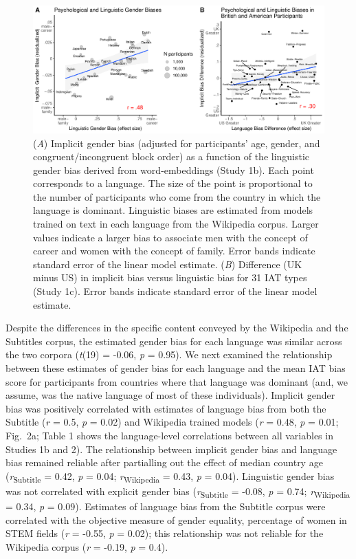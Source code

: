 \documentclass[9pt,twocolumn,twoside]{pnas-new}
\begin{document}
\begin{figure}[t!]
\centering
\includegraphics[width=17cm]{pnas_rmd/iat_lang_pnas_files/figure-latex/study1_fig.pdf}
\caption{\label{fig:unnamed-chunk-11} ({\it A})  Implicit gender bias (adjusted for participants' age, gender, and congruent/incongruent block order) as a function of the linguistic gender bias derived from word-embeddings (Study 1b). Each point corresponds to a language. The size of the point is proportional to the number of participants who come from the country in which the language is dominant. Linguistic biases are estimated from models trained on text in each language from the Wikipedia corpus. Larger values indicate a larger bias to associate men with the concept of career and women with the concept of family. Error bands indicate standard error of the linear model estimate. ({\it B}) Difference (UK minus US) in implicit bias versus linguistic bias for 31 IAT types (Study 1c). Error bands indicate standard error of the linear model
estimate.}
\end{figure}



Despite the differences in the specific content conveyed by the
Wikipedia and the Subtitles corpus, the estimated gender bias for each
language was similar across the two corpora (\emph{t}(19) = -0.06,
\emph{p} = 0.95). We next examined the relationship between these
estimates of gender bias for each language and the mean IAT bias score
for participants from countries where that language was dominant (and,
we assume, was the native language of most of these individuals).
Implicit gender bias was positively correlated with estimates of
language bias from both the Subtitle (\emph{r} = 0.5, \emph{p} = 0.02)
and Wikipedia trained models (\emph{r} = 0.48, \emph{p} = 0.01; Fig.\ 2a;
Table 1 shows the language-level correlations between all variables in
Studies 1b and 2). The relationship between implicit gender bias and
language bias remained reliable after partialling out the effect of
median country age (\emph{r}\textsubscript{Subtitle}  = 0.42, \emph{p} = 0.04;
\emph{r}\textsubscript{Wikipedia}  = 0.43, \emph{p} = 0.04). Linguistic gender bias was
not correlated with explicit gender bias (\emph{r}\textsubscript{Subtitle} = -0.08,
\emph{p} = 0.74; \emph{r}\textsubscript{Wikipedia} = 0.34, \emph{p} = 0.09). Estimates
of language bias from the Subtitle corpus were correlated with the
objective measure of gender equality, percentage of women in STEM fields
(\emph{r} = -0.55, \emph{p} = 0.02); this relationship was not reliable
for the Wikipedia corpus (\emph{r} = -0.19, \emph{p} = 0.4).
\end{document}
